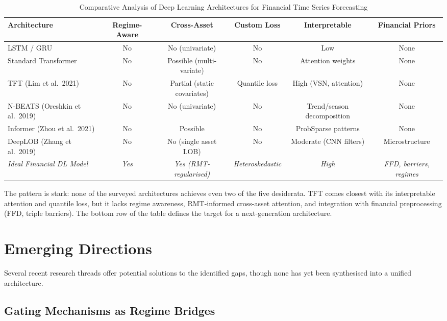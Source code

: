 \documentclass[conference]{IEEEtran}
\begin{document}
\begin{table}[t]
\centering
\caption{Comparative Analysis of Deep Learning Architectures for Financial Time Series Forecasting}
\label{tab:comparison}
\begin{tabular}{@{}lccccc@{}}
\toprule
\textbf{Architecture} & \textbf{Regime-Aware} & \textbf{Cross-Asset} & \textbf{Custom Loss} & \textbf{Interpretable} & \textbf{Financial Priors} \\
\midrule
LSTM / GRU & No & No (univariate) & No & Low & None \\
Standard Transformer & No & Possible (multi-variate) & No & Attention weights & None \\
TFT (Lim et al.\ 2021) & No & Partial (static covariates) & Quantile loss & High (VSN, attention) & None \\
N-BEATS (Oreshkin et al.\ 2019) & No & No (univariate) & No & Trend/season decomposition & None \\
Informer (Zhou et al.\ 2021) & No & Possible & No & ProbSparse patterns & None \\
DeepLOB (Zhang et al.\ 2019) & No & No (single asset LOB) & No & Moderate (CNN filters) & Microstructure \\
\addlinespace
\textit{Ideal Financial DL Model} & \textit{Yes} & \textit{Yes (RMT-regularised)} & \textit{Heteroskedastic} & \textit{High} & \textit{FFD, barriers, regimes} \\
\bottomrule
\end{tabular}
\end{table}

The pattern is stark: none of the surveyed architectures achieves even two of the five desiderata. TFT comes closest with its interpretable attention and quantile loss, but it lacks regime awareness, RMT-informed cross-asset attention, and integration with financial preprocessing (FFD, triple barriers). The bottom row of the table defines the target for a next-generation architecture.

\section{Emerging Directions}
\label{sec:emerging}

Several recent research threads offer potential solutions to the identified gaps, though none has yet been synthesised into a unified architecture.

\subsection{Gating Mechanisms as Regime Bridges}
\end{document}
